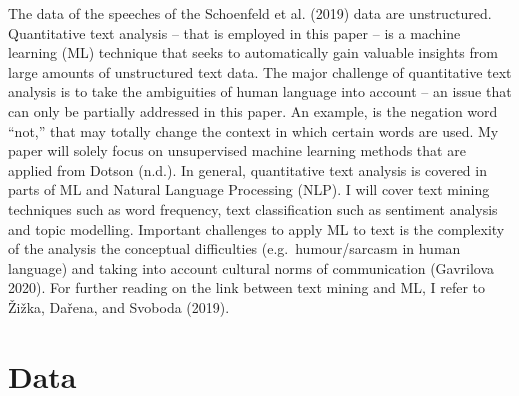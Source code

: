 \documentclass[
]{article}
\begin{document}
The data of the speeches of the Schoenfeld et al. (2019) data are
unstructured. Quantitative text analysis -- that is employed in this
paper -- is a machine learning (ML) technique that seeks to
automatically gain valuable insights from large amounts of unstructured
text data. The major challenge of quantitative text analysis is to take
the ambiguities of human language into account -- an issue that can only
be partially addressed in this paper. An example, is the negation word
``not,'' that may totally change the context in which certain words are
used. \newline My paper will solely focus on unsupervised machine
learning methods that are applied from Dotson (n.d.). In general,
quantitative text analysis is covered in parts of ML and Natural
Language Processing (NLP). I will cover text mining techniques such as
word frequency, text classification such as sentiment analysis and topic
modelling. Important challenges to apply ML to text is the complexity of
the analysis the conceptual difficulties (e.g.~humour/sarcasm in human
language) and taking into account cultural norms of communication
(Gavrilova 2020). For further reading on the link between text mining
and ML, I refer to Žižka, Dařena, and Svoboda (2019).

\hypertarget{data}{%
\section*{Data}\label{data}}
\end{document}
